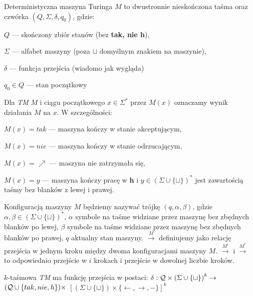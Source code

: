 \begin{definicja}
    Deterministyczna maszyna Turinga $M$ to dwustronnie nieskończona taśma oraz czwórka $(Q, \Sigma, \delta, q_0)$, gdzie:
    \begin{itemize*}[label={}]
        \item $Q$ --- skończony zbiór stanów (bez \textbf{tak, nie h}),
        \item $\Sigma$ --- alfabet maszyny (poza $\sqcup$ domyślnym znakiem na maszynie),
        \item $\delta$ --- funkcja przejścia (wiadomo jak wygląda)
        \item $q_0 \in Q$ --- stan początkowy
    \end{itemize*}
\end{definicja}
\begin{definicja}
    Dla \textit{TM} $M$ i ciągu początkowego $x \in \Sigma^{*}$ przez $M(x)$
    oznaczamy wynik działania $M$ na $x$. W szczególności:
    \begin{itemize*}[label={}]
        \item $M(x) = tak$ --- maszyna kończy w stanie akceptującym,
        \item $M(x) = nie$ --- maszyna kończy w stanie odrzucającym,
        \item $M(x) = \nearrow$ --- maszyna nie zatrzymała się,
        \item $M(x) = y$ --- maszyna kończy pracę w \textbf{h} i $y \in (\Sigma \cup \{\sqcup\})^{*}$ jest zawartością taśmy bez blanków z lewej i prawej.
    \end{itemize*}
\end{definicja}
\begin{definicja}
    Konfiguracją maszyny $M$ będziemy nazywać trójkę $(q, \alpha, \beta)$,
    gdzie $\alpha, \beta \in {(\Sigma \cup \{\sqcup\})}^{*}$, 
    $\alpha$ symbole na taśme widziane przez maszynę bez zbędnych blanków po lewej,
    $\beta$ symbole na taśme widziane przez maszynę bez zbędnych blanków po prawej,
    $q$ aktualny stan maszyny.
    $\stackrel{M}{\rightarrow}$ definiujemy jako relację przejścia w jednym kroku między dwoma konfiguracjami maszyny $M$.
    $\stackrel{M^i}{\rightarrow}$ i $\stackrel{M^{*}}{\rightarrow}$ to odpowiednio przejście w $i$ krokach i przejście w dowolnej liczbie kroków.
\end{definicja}
\begin{definicja}
    $k$-taśmowa \textit{TM} ma funkcję przejścia w postaci:
    $\delta : \mathcal{Q} \times {(\Sigma \cup \{\sqcup\})}^{k} \rightarrow$ $(\mathcal{Q} \cup \{tak, nie, h\}) \times$ ${[(\Sigma \cup \{\sqcup\}) \times \{\leftarrow, \rightarrow, -\}]}^k$
\end{definicja}
